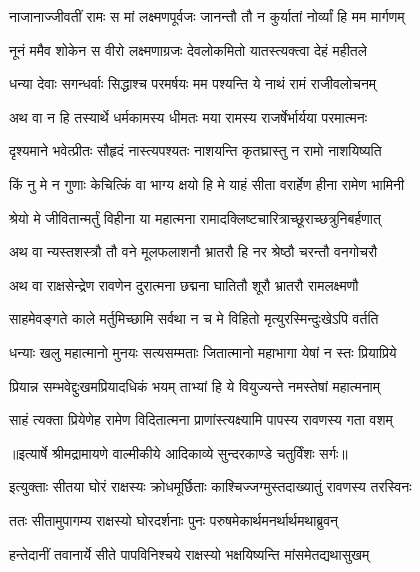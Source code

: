 \twolineshloka
{नाजानाज्जीवतीं रामः स मां लक्ष्मणपूर्वजः}
{जानन्तौ तौ न कुर्यातां नोर्व्यां हि मम मार्गणम्} %

\twolineshloka
{नूनं ममैव शोकेन स वीरो लक्ष्मणाग्रजः}
{देवलोकमितो यातस्त्यक्त्वा देहं महीतले} %

\twolineshloka
{धन्या देवाः सगन्धर्वाः सिद्धाश्च परमर्षयः}
{मम पश्यन्ति ये नाथं रामं राजीवलोचनम्} %

\twolineshloka
{अथ वा न हि तस्यार्थे धर्मकामस्य धीमतः}
{मया रामस्य राजर्षेर्भार्यया परमात्मनः} %

\twolineshloka
{दृश्यमाने भवेत्प्रीतः सौहृदं नास्त्यपश्यतः}
{नाशयन्ति कृतघ्रास्तु न रामो नाशयिष्यति} %

\twolineshloka
{किं नु मे न गुणाः केचित्किं वा भाग्य क्षयो हि मे}
{याहं सीता वरार्हेण हीना रामेण भामिनी} %

\twolineshloka
{श्रेयो मे जीवितान्मर्तुं विहीना या महात्मना}
{रामादक्लिष्टचारित्राच्छूराच्छत्रुनिबर्हणात्} %

\twolineshloka
{अथ वा न्यस्तशस्त्रौ तौ वने मूलफलाशनौ}
{भ्रातरौ हि नर श्रेष्ठौ चरन्तौ वनगोचरौ} %

\twolineshloka
{अथ वा राक्षसेन्द्रेण रावणेन दुरात्मना}
{छद्मना घातितौ शूरौ भ्रातरौ रामलक्ष्मणौ} %

\twolineshloka
{साहमेवङ्गते काले मर्तुमिच्छामि सर्वथा}
{न च मे विहितो मृत्युरस्मिन्दुःखेऽपि वर्तति} %

\twolineshloka
{धन्याः खलु महात्मानो मुनयः सत्यसम्मताः}
{जितात्मानो महाभागा येषां न स्तः प्रियाप्रिये} %

\twolineshloka
{प्रियान्न सम्भवेद्दुःखमप्रियादधिकं भयम्}
{ताभ्यां हि ये वियुज्यन्ते नमस्तेषां महात्मनाम्} %

\twolineshloka
{साहं त्यक्ता प्रियेणेह रामेण विदितात्मना}
{प्राणांस्त्यक्ष्यामि पापस्य रावणस्य गता वशम्} %


{॥इत्यार्षे श्रीमद्रामायणे वाल्मीकीये आदिकाव्ये सुन्दरकाण्डे चतुर्विंशः सर्गः॥}


\twolineshloka
{इत्युक्ताः सीतया घोरं राक्षस्यः क्रोधमूर्छिताः}
{काश्चिज्जग्मुस्तदाख्यातुं रावणस्य तरस्विनः} %

\twolineshloka
{ततः सीतामुपागम्य राक्षस्यो घोरदर्शनाः}
{पुनः परुषमेकार्थमनर्थार्थमथाब्रुवन्} %

\twolineshloka
{हन्तेदानीं तवानार्ये सीते पापविनिश्चये}
{राक्षस्यो भक्षयिष्यन्ति मांसमेतद्यथासुखम्} %

